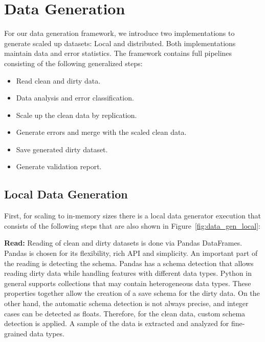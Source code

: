 \section{Data Generation}
\label{sec:data_gen}
For our data generation framework, we introduce two implementations to generate scaled up datasets: Local and distributed.
Both implementations maintain data and error statistics. 
The framework contains full pipelines consisting of the following generalized steps:

\begin{itemize}
    \item Read clean and dirty data.
    \item Data analysis and error classification.
    \item Scale up the clean data by replication.
    \item Generate errors and merge with the scaled clean data.
    \item Save generated dirty dataset.
    \item Generate validation report.
\end{itemize}

\subsection{Local Data Generation}
\label{sec:local_generator}




First, for scaling to in-memory sizes there is a local data generator execution that consists of the following steps that are also shown in Figure~\ref{fig:data_gen_local}:

\textbf{Read:} 
Reading of clean and dirty datasets is done via Pandas DataFrames. 
Pandas is chosen for its flexibility, rich API and simplicity. 
An important part of the reading is detecting the schema.
Pandas has a schema detection that allows reading dirty data while handling features with different data types. 
Python in general supports collections that may contain heterogeneous data types. 
These properties together allow the creation of a save schema for the dirty data.
On the other hand, the automatic schema detection is not always precise, and integer cases can be detected as floats. 
Therefore, for the clean data, custom schema detection is applied. 
A sample of the data is extracted and analyzed for fine-grained data types. 

